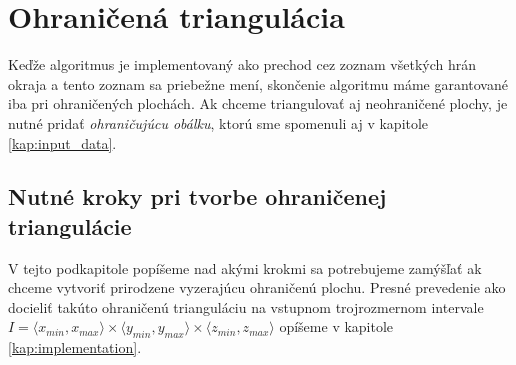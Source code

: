 \section{Ohraničená triangulácia}
\label{kap:bounded_triangulation}
Keďže algoritmus je implementovaný ako prechod cez zoznam všetkých hrán okraja a tento zoznam 
sa priebežne mení, skončenie algoritmu máme garantované iba pri ohraničených plochách.
Ak chceme triangulovať aj neohraničené plochy, je nutné pridať \textit{ohraničujúcu obálku}, 
ktorú sme spomenuli aj v kapitole \ref{kap:input_data}.

\subsection{Nutné kroky pri tvorbe ohraničenej triangulácie}

V tejto podkapitole popíšeme nad akými krokmi sa potrebujeme zamýšľať ak chceme vytvoriť prirodzene 
vyzerajúcu ohraničenú plochu. Presné prevedenie
ako docieliť takúto ohraničenú trianguláciu na vstupnom trojrozmernom intervale 
$I = \langle x_{min}, x_{max} \rangle \times \langle y_{min}, y_{max} \rangle \times 
\langle z_{min}, z_{max} \rangle$ opíšeme v kapitole \ref{kap:implementation}.

